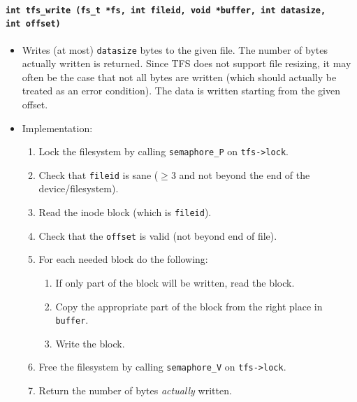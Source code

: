 \documentclass[twoside,a4paper]{report}
\makeatletter
\newenvironment{function}[3]{%
\paragraph{\texttt{#1 {\textbf{#2}} (#3)}}%
\index{#2@\texttt{#2}}%
\begin{itemize}%
}{%
\end{itemize}%
}
\newcommand{\brtab}{\\\hspace*{1cm}}
\makeatother
\begin{document}
\begin{function}{int}{tfs\_write}{fs\_t *fs, int fileid, void *buffer, int datasize,\brtab int offset}

\item Writes (at most) \texttt{datasize} bytes to the given file. The
number of bytes actually written is returned. Since TFS does not
support file resizing, it may often be the case that not all bytes are
written (which should actually be treated as an error condition). The
data is written starting from the given offset.

\item Implementation:
\begin{enumerate}
\item Lock the filesystem by calling \texttt{semaphore\_P} on
\texttt{tfs->lock}.
\item Check that \texttt{fileid} is sane ($\ge3$ and not beyond the
end of the device/filesystem).
\item Read the inode block (which is \texttt{fileid}).
\item Check that the \texttt{offset} is valid (not beyond end of file).
\item For each needed block do the following:
  \begin{enumerate}
  \item If only part of the block will be written, read the block.
  \item Copy the appropriate part of the block from the right place in
  \texttt{buffer}.
  \item Write the block.
  \end{enumerate}
\item Free the filesystem by calling \texttt{semaphore\_V} on
\texttt{tfs->lock}.
\item Return the number of bytes \emph{actually} written.
\end{enumerate}

\end{function}
\end{document}
